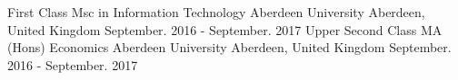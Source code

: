 

\begin{cventries}

  \cventry
    {First Class}
    {Msc in Information Technology} %
    {Aberdeen University} %
    {Aberdeen, United Kingdom} %
    {September. 2016 - September. 2017} %
  \vspace{1em} %
  \cventry
    {Upper Second Class}
    {MA (Hons) Economics } %
    {Aberdeen University} %
    {Aberdeen, United Kingdom} %
    {September. 2016 - September. 2017} %


\end{cventries}
